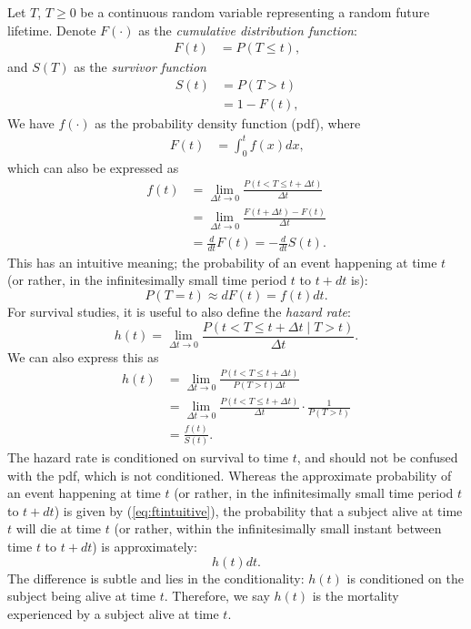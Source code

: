 \documentclass[12pt]{article}
\begin{document}
Let $T$, $T \geq 0$ be a continuous random variable representing a random future lifetime. Denote $F(\cdot)$ as the \emph{cumulative distribution function}:
\begin{align*}
  F(t) &= P(T \leq t)
  \text{,}
\end{align*}
and $S(T)$ as the \emph{survivor function}
\begin{align}
  S(t) &= P(T > t)  \nonumber \\
       &= 1- F(t)  \label{eq:StFt}
  \text{,}
\end{align}
We have $f(\cdot)$ as the probability density function (pdf), where
\begin{align*}
  F(t) &= \int_{0}^{t}{ f(x) dx}
  \text{,}
\end{align*}
which can also be expressed as
\begin{align}
  f(t)
  &= \lim_{\Delta t \rightarrow 0} \frac{ P( t < T \leq t + \Delta t ) }{ \Delta t} \nonumber \\
  &= \lim_{\Delta t \rightarrow 0} \frac{ F(t+\Delta t) - F(t)  }{ \Delta t} \nonumber \\
  &=  \frac{d}{dt} F(t) = -\frac{d}{dt} S(t)   \label{eq:ftFtSt}
  \text{.}
\end{align}
This has an intuitive meaning; the probability of an event happening at time $t$ (or rather, in the infinitesimally small time period $t$ to $t + dt$ is):
\begin{equation}
P(T=t) \approx d F(t) = f(t) dt \text{.}
\label{eq:ftintuitive}
\end{equation}
For survival studies, it is useful to also define the \emph{hazard rate}:
\begin{equation*}
  h(t) =
     \lim_{\Delta t \to 0}
     \frac{ P\left( t < T \leq t + \Delta t \; | \; T > t \right) }{\Delta t} \text{.}
\end{equation*}
We can also express this as
\begin{align}
   h(t)
   &= \lim_{\Delta t \to 0}
   \frac{ P( t < T \leq t + \Delta t ) }{ P( T > t)  \Delta t} \nonumber \\
   &= \lim_{\Delta t \to 0}
   \frac{ P( t < T \leq t + \Delta t ) }{ \Delta t} \cdot
   \frac{1 }{ P( T > t) } \nonumber \\
   &= \frac{ f(t) }{ S(t) } \label{eq:htftSt}
   \text{.}
\end{align}
The hazard rate is conditioned on survival to time $t$, and should not be confused with the pdf, which is not conditioned.
Whereas the approximate probability of an event happening at time $t$ (or rather, in the infinitesimally small time period $t$ to $t + dt$) is given by (\ref{eq:ftintuitive}), the probability that a subject alive at time $t$ will die at time $t$ (or rather, within the infinitesimally small instant between time $t$ to $t + dt$) is approximately:
\begin{equation}
h(t) dt \text{.}
\label{eq:htintuitive}
\end{equation}
The difference is subtle and lies in the conditionality: $h(t)$ is conditioned on the subject being alive at time $t$.
Therefore, we say $h(t)$ is the mortality experienced by a subject alive at time $t$.
\end{document}
